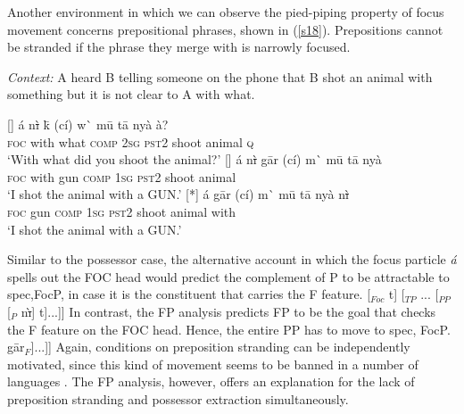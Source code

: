 \documentclass[output=paper,
modfonts
]{langscibook}
\begin{document}
Another environment in which we can observe the pied-piping property of focus movement concerns prepositional phrases, shown in (\ref{s18}). Prepositions cannot be stranded if the phrase they merge with is narrowly focused.
\begin{exe}
\ex \textit{Context:} A heard B telling someone on the phone that B shot an animal with something but it is not clear to A with what.\label{s18}
\begin{xlist}
[]{
\gll \'a n\sout{\`i} k\=\textepsilon{} (c\'i) w\`\textepsilon{} m\=u t\=a ny\`a \`a? \\  
   \textsc{foc} with what \textsc{comp} \textsc{2sg} \textsc{pst2} shoot animal \textsc{q}    \\ 
\glt `With what did you shoot the animal?'}
[]{
\gll \'a n\sout{\`i} g\=ar (c\'i) m\`\textepsilon{} m\=u t\=a ny\`a \\  
     \textsc{foc} with gun \textsc{comp} \textsc{1sg} \textsc{pst2} shoot animal  \\ 
\glt `I shot the animal with a GUN.'}
[*]{
\gll \'a g\=ar (c\'i) m\`\textepsilon{} m\=u t\=a ny\`a n\sout{\`i} \\  
     \textsc{foc} gun \textsc{comp} \textsc{1sg} \textsc{pst2} shoot animal with \\ 
\glt `I shot the animal with a GUN.'}
\end{xlist}
\end{exe}
Similar to the possessor case, the alternative account in which the focus particle {\em \'a} spells out the FOC head would predict the complement of P to be attractable to spec,FocP, in case it is the constituent that carries the F feature.
\ea *[... \'a\sub{1} [$_{FocP}$ [$_{DP}$ \textipa{N}g\tikzmark{f}\=ar$_F$] [$_{Foc}$ t] [$_{TP}$ ... [$_{PP}$ [$_{P}$ n\sout{\`{\i}}] t]...]]
	 \label{s19}
\z
\vspace{3mm}
In contrast, the FP analysis predicts FP to be the goal that checks the F feature on the FOC head. Hence, the entire PP has to move to spec, FocP.
\ea \relax[$_{FocP}$ \tikzmark{f2}\hspace{2mm}\tikzmark{f} [$_{Foc}$ c\'i] [$_{TP}$ ... [$_{F\tikzmark{t}P}$ \'a [$_{PP}$ [$_P$ n\sout{\`{\i}}] g\=ar$_F$]...]]
     \label{s20}
\z
\vspace{6mm}
Again, conditions on preposition stranding can be independently motivated, since this kind of movement seems to be banned in a number of languages \citep{Abels2003,Heck2008}. The FP analysis, however, offers an explanation for the lack of preposition stranding and possessor extraction simultaneously.
\end{document}
